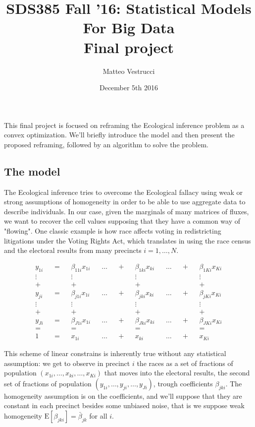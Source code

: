 \documentclass{article}
\title{SDS385 Fall '16: Statistical Models For Big Data\\Final project}
\author{Matteo Vestrucci}
\date{December 5th 2016}
\begin{document}
\maketitle

This final project is focused on reframing the Ecological inference problem as a convex optimization. We'll briefly introduce the model and then present the proposed reframing, followed by an algorithm to solve the problem.

\subsection*{The model}

The Ecological inference tries to overcome the Ecological fallacy using weak or strong assumptions of homogeneity in order to be able to use aggregate data to describe individuals. In our case, given the marginals of many matrices of fluxes, we want to recover the cell values supposing that they have a common way of "flowing". One classic example is how race affects voting in redistricting litigations under the Voting Rights Act, which translates in using the race census and the electoral results from many precincts $i=1,\ldots,N$.

\begin{align*}
&y_{1i}&&=&&\beta_{11i}x_{1i}&&\ldots&&+&&\beta_{1ki}x_{ki}&&\ldots&&+&&\beta_{1Ki}x_{Ki}&\\
&\vdots&& &&\vdots&& && &&\vdots&& && &&\vdots&\\
&+&& &&+&& && &&+&& && &&+&\\
&y_{ji}&&=&&\beta_{j1i}x_{1i}&&\ldots&&+&&\beta_{jki}x_{ki}&&\ldots&&+&&\beta_{jKi}x_{Ki}&\\
&\vdots&& &&\vdots&& && &&\vdots&& && &&\vdots&\\
&+&& &&+&& && &&+&& && &&+&\\
&y_{Ji}&&=&&\beta_{J1i}x_{1i}&&\ldots&&+&&\beta_{Jki}x_{ki}&&\ldots&&+&&\beta_{JKi}x_{Ki}&\\
&=&& &&=&& && &&=&& && &&=&\\
&1&&=&&x_{1i}&&\ldots&&+&&x_{ki}&&\ldots&&+&&x_{Ki}&
\end{align*}

This scheme of linear constrains is inherently true without any statistical assumption: we get to observe in precinct $i$ the races as a set of fractions of population $(x_{1i},\ldots,x_{ki},\ldots,x_{Ki})$ that moves into the electoral results, the second set of fractions of population $(y_{1i},\ldots,y_{ji},\ldots,y_{Ji})$, trough coefficients $\beta_{jki}$. The homogeneity assumption is on the coefficients, and we'll suppose that they are constant in each precinct besides some unbiased noise, that is we suppose weak homogeneity $\text{E}[\beta_{jki}]=\bar{\beta}_{jk}$ for all $i$.
\end{document}
